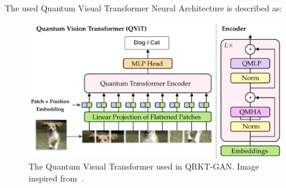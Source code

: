 \documentclass[12pt,a4paper]{report}
\begin{document}
The used Quantum Visual Transformer Neural Architecture is described as:
\\
\begin{figure}[th]
  \centering
  \includegraphics[scale=0.12]{./pics/Blank diagram - Page 1.png}
  \caption[The Quantum Visual Transformer used in QRKT-GAN]{The Quantum Visual Transformer used in QRKT-GAN. Image inspired from~\cite{Comajoan_Cara_2024}.}
  \label{fig:p12}
\end{figure}
\end{document}
